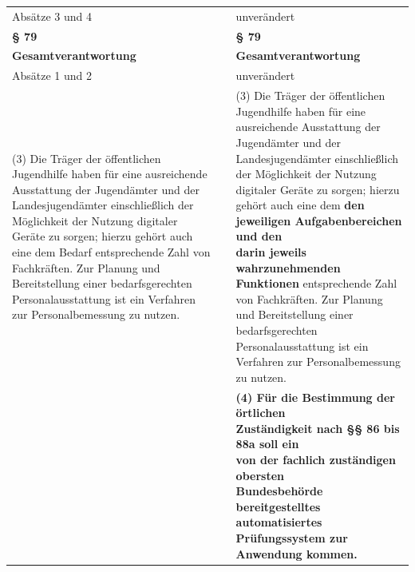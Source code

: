 \documentclass[10pt,a4paper,landscape]{article}
\begin{document}
\begin{longtable}{|L{8.2cm}|L{8.2cm}|L{8.2cm}|}
Absätze 3 und 4 &  & unverändert \\
\hhline{|---|}
\textbf{\S{} 79} &  & \textbf{\S{} 79} \\
\hhline{|---|}
\textbf{Gesamtverantwortung} &  & \textbf{Gesamtverantwortung} \\
\hhline{|---|}
Absätze 1 und 2 &  & unverändert \\
\hhline{|---|}
(3) Die Träger der öffentlichen Jugendhilfe  \newline haben für eine ausreichende Ausstattung  \newline der Jugendämter und der  \newline Landesjugendämter einschließlich der  \newline Möglichkeit der Nutzung digitaler Geräte zu  \newline sorgen; hierzu gehört auch eine dem  \newline \textcolor{diffred}{Bedarf} entsprechende Zahl von  \newline Fachkräften. Zur Planung und  \newline Bereitstellung einer bedarfsgerechten  \newline Personalausstattung ist ein Verfahren zur  \newline Personalbemessung zu nutzen. &  & (3) Die Träger der öffentlichen Jugendhilfe  \newline haben für eine ausreichende Ausstattung  \newline der Jugendämter und der  \newline Landesjugendämter einschließlich der  \newline Möglichkeit der Nutzung digitaler Geräte zu  \newline sorgen; hierzu gehört auch eine dem \textbf{\textcolor{diffgreen}{den  \newline jeweiligen Aufgabenbereichen und den  \newline darin jeweils wahrzunehmenden  \newline Funktionen}} entsprechende Zahl von  \newline Fachkräften. Zur Planung und  \newline Bereitstellung einer bedarfsgerechten  \newline Personalausstattung ist ein Verfahren zur  \newline Personalbemessung zu nutzen. \\
\hhline{|---|}
 &  & \textbf{\textcolor{diffgreen}{(4) Für die Bestimmung der örtlichen  \newline Zuständigkeit nach \S{}\S{} 86 bis 88a soll ein  \newline von der fachlich zuständigen obersten  \newline Bundesbehörde bereitgestelltes  \newline automatisiertes Prüfungssystem zur  \newline Anwendung kommen.}} \\

\end{longtable}
\end{document}
